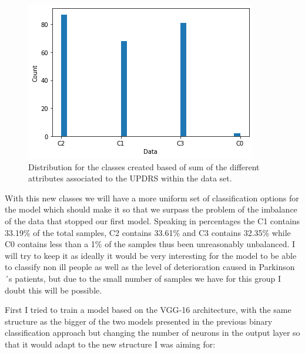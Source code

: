 \documentclass[12pt, a4paper]{article}
\begin{document}
	
	\begin{figure}[H]
		\centering
		\label{UPDRSSumDistributionClasses}
		\includegraphics[scale=0.95]{img/plots/UPDRSsumClasses.png}
		\caption{Distribution for the classes created based of sum of the different attributes associated to the UPDRS within the data set.}
	\end{figure}

	\vspace{10mm}
	
	With this new classes we will have a more uniform set of classification options for the model which should make it so that we surpass the problem of the imbalance of the data that stopped our first model. Speaking in percentages the C1 contains 33.19\% of the total samples, C2 contains 33.61\% and C3 contains 32.35\% while C0 contains less than a 1\% of the samples thus been unreasonably unbalanced. I will try to keep it as ideally it would be very interesting for the model to be able to classify non ill people as well as the level of deterioration caused in Parkinson´s patients, but due to the small number of samples we have for this group I doubt this will be possible.
	
	First I tried to train a model based on the VGG-16 architecture, with the same structure as the bigger of the two models presented in the previous binary classification approach but changing the number of neurons in the output layer so that it would adapt to the new structure I was aiming for:
	
		\vspace{10mm}
	
\end{document}
